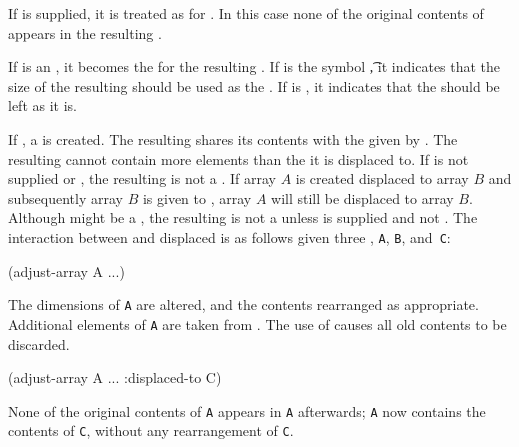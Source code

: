 If  is supplied, it is treated as for
.  In this case none of the original contents of
 appears in the resulting .

If  is an ,
it becomes the  for the resulting .
If  is the symbol \t,
it indicates that the size of the resulting  
should be used as the .
If  is \nil,
it indicates that the  should be left as it is.

If 
, a 
is created. The resulting  shares its contents with the  given by
.
The resulting  cannot contain more elements than the 
it is displaced to.  
If  is not supplied or \nil,
the resulting  is not a .
If array $A$ is created displaced to array $B$ and subsequently
array $B$ is given to , array $A$ will still be
displaced to array $B$.
Although  might be a , 
the resulting  is not a  unless
 is supplied and not \nil.
The interaction between  and 
displaced  
is as follows given three , {\tt A}, {\tt B}, and~{\tt C}:

\beginlist
{}

\code
 (adjust-array A ...)
\endcode

The dimensions of {\tt A} are altered, and the
contents rearranged as appropriate.  
Additional elements of {\tt A} are taken from
.  
The use of  causes all old contents to be
discarded.


\code
 (adjust-array A ... :displaced-to C)
\endcode
               
None of the original contents of {\tt A} appears in 
{\tt A} afterwards; {\tt A} now contains
the contents of {\tt C}, without any rearrangement of {\tt C}.


